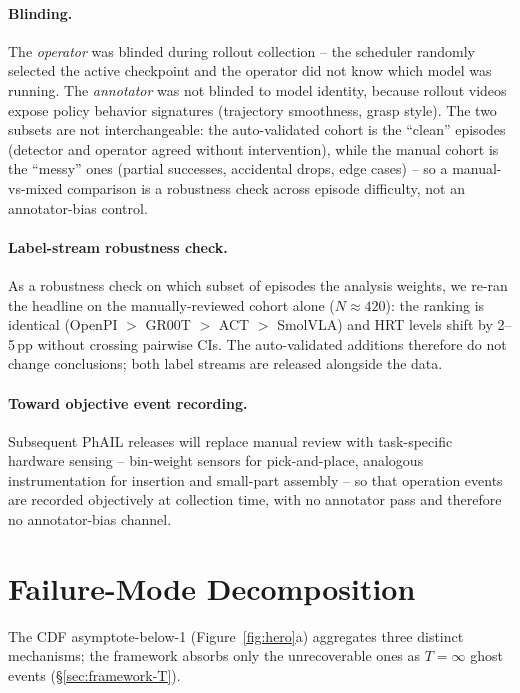 \documentclass{article}
\begin{document}
\paragraph{Blinding.} The \emph{operator} was blinded during rollout collection -- the scheduler randomly selected the active checkpoint and the operator did not know which model was running. The \emph{annotator} was not blinded to model identity, because rollout videos expose policy behavior signatures (trajectory smoothness, grasp style). The two subsets are not interchangeable: the auto-validated cohort is the ``clean'' episodes (detector and operator agreed without intervention), while the manual cohort is the ``messy'' ones (partial successes, accidental drops, edge cases) -- so a manual-vs-mixed comparison is a robustness check across episode difficulty, not an annotator-bias control.

\paragraph{Label-stream robustness check.} As a robustness check on which subset of episodes the analysis weights, we re-ran the headline on the manually-reviewed cohort alone ($N \approx 420$): the ranking is identical (OpenPI $>$ GR00T $>$ ACT $>$ SmolVLA) and HRT levels shift by 2--5\,pp without crossing pairwise CIs. The auto-validated additions therefore do not change conclusions; both label streams are released alongside the data.

\paragraph{Toward objective event recording.} Subsequent PhAIL releases will replace manual review with task-specific hardware sensing -- bin-weight sensors for pick-and-place, analogous instrumentation for insertion and small-part assembly -- so that operation events are recorded objectively at collection time, with no annotator pass and therefore no annotator-bias channel.

\section{Failure-Mode Decomposition}\label{app:failuremodes}

The CDF asymptote-below-1 (Figure~\ref{fig:hero}a) aggregates three distinct mechanisms; the framework absorbs only the unrecoverable ones as $T = \infty$ ghost events (\S\ref{sec:framework-T}).
\end{document}
